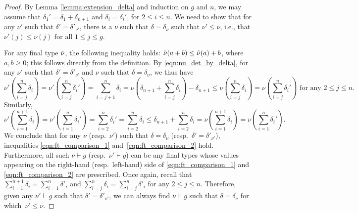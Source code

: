 \documentclass[10pt,a4paper]{amsart}
\begin{document}
\begin{proof} By Lemma \ref{lemma:extension_delta} and induction on $g$ and $n$, we may assume that $\delta_1' = \delta_1 + \delta_{n+1}$ and $\delta_i = \delta_i'$, for $2\leq i \leq n$. We need to show that for any $\nu'$ such that $\delta' = \delta'_{\nu'}$, there is a $\nu$ such that $\delta = \delta_{\nu}$ such that $\nu' \leq \nu$, i.e., that 
$\nu'(j) \leq \nu(j)$ for all $1\leq j \leq g$. 

For any final type $\Tilde{\nu}$, the following inequality holds: $\Tilde{\nu}(a + b) \leq \Tilde{\nu}(a) + b$, where $a, b \geq 0$; this follows directly from the definition. By \eqref{eqn:nu_det_by_delta}, for any $\nu'$ such that $\delta' = \delta'_{\nu'}$ and $\nu$ such that $\delta = \delta_{\nu}$, we thus have 
\begin{equation}
\nu'(\sum_{i = j}^{n}\delta_i) = \nu'(\sum_{i = j}^n\delta_i') = \sum_{i = j + 1}^{n}\delta_i = \nu(\delta_{n + 1} + \sum_{i = j}^{n}\delta_i) - \delta_{n + 1} \leq \nu(\sum_{i = j}^{n}\delta_i) = \nu(\sum_{i = j}^{n}\delta_i') \text{ for any }2\leq j \leq n.
\label{eqn:ft_comparison_1}
\end{equation}
Similarly, 
\begin{equation}
\nu'(\sum_{i = 1}^{n + 1}\delta_i) = \nu'(\sum_{i = 1}^n\delta_i') = \sum_{i = 2}^n\delta_i' = \sum_{i = 2}^n\delta_i \leq \delta_{n + 1} + \sum_{i = 2}^n\delta_i  = \nu(\sum_{i = 1}^{n + 1}\delta_i) = \nu(\sum_{i = 1}^{n}\delta_i').
\label{eqn:ft_comparison_2}
\end{equation}
We conclude that for any $\nu$ (resp.~$\nu'$) such that $\delta = \delta_{\nu}$ (resp.~$\delta' = \delta'_{\nu'}$), inequalities \eqref{eqn:ft_comparison_1} and~\eqref{eqn:ft_comparison_2} hold. Furthermore, all such $\nu\vdash g$ (resp.~$\nu'\vdash g$) can be any final types whose values appearing on the right-hand (resp.~left-hand) side of \eqref{eqn:ft_comparison_1} and \eqref{eqn:ft_comparison_2} are prescribed. 
Once again, recall that $\sum_{i = 1}^{n+1}\delta_i = \sum_{i = 1}^n\delta'_i$ and $\sum_{i = j}^n\delta_i = \sum_{i = j}^n\delta'_i$ for any $2 \leq j \leq n$.
Therefore, given any $\nu' \vdash g$ such that $\delta' = \delta'_{\nu'}$, we can always find $\nu \vdash g$ such that $\delta = \delta_{\nu}$ for which~$\nu' \leq \nu$.
\end{proof}
\end{document}
